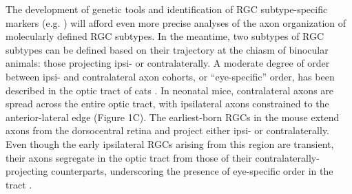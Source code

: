 The development of genetic tools and identification of RGC subtype-specific markers (e.g. \cite{blackshaw2004genomic,dhande2014retinal}) will afford even more precise analyses of the axon organization of molecularly defined RGC subtypes.
In the meantime, two subtypes of RGC subtypes can be defined based on their trajectory at the chiasm of binocular animals: those projecting ipsi- or contralaterally.
A moderate degree of order between ipsi- and contralateral axon cohorts, or “eye-specific” order, has been described in the optic tract of cats \cite{torrealba1982studies}.
In neonatal mice, contralateral axons are spread across the entire optic tract, with ipsilateral axons constrained to the anterior-lateral edge \cite{godement1984prenatal} (Figure 1C). %
The earliest-born RGCs in the mouse extend axons from the dorsocentral retina and project either ipsi- or contralaterally.
Even though the early ipsilateral RGCs arising from this region are transient, their axons segregate in the optic tract from those of their contralaterally-projecting counterparts, underscoring the presence of eye-specific order in the tract \cite{soares2015transient}.
